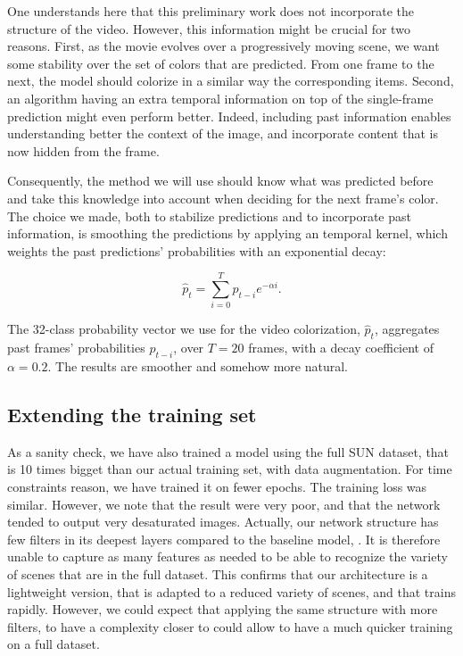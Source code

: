 \documentclass[10pt,twocolumn,letterpaper]{article}
\begin{document}
One understands here that this preliminary work does not incorporate the structure of the video. However, this information might be crucial for two reasons. First, as the movie evolves over a progressively moving scene, we want some stability over the set of colors that are predicted. From one frame to the next, the model should colorize in a similar way the corresponding items. Second, an algorithm having an extra temporal information on top of the single-frame prediction might even perform better. Indeed, including past information enables understanding better the context of the image, and incorporate content that is now hidden from the frame.

Consequently, the method we will use should know what was predicted before and take this knowledge into account when deciding for the next frame's color. The choice we made, both to stabilize predictions and to incorporate past information, is smoothing the predictions by applying an temporal kernel, which weights the past predictions' probabilities with an exponential decay:

 $$\hat p_t = \sum_{i = 0}^T p_{t-i} e^{-\alpha i}.$$

 The 32-class probability vector we use for the video colorization, $\hat p_t$, aggregates past frames' probabilities $p_{t-i}$, over $T=20$ frames, with a decay coefficient of $\alpha=0.2$. The results are smoother and somehow more natural.

\subsection{Extending the training set}

As a sanity check, we have also trained a model using the full SUN dataset, that is 10 times bigget than our actual training set, with data augmentation. For time constraints reason, we have trained it on fewer epochs. The training loss was similar. However, we note that the result were very poor, and that the network tended to output very desaturated images. Actually, our network structure has few filters in its deepest layers compared to the baseline model, \cite{zhang2016colorful}. It is therefore unable to capture as many features as needed to be able to recognize the variety of scenes that are in the full dataset. This confirms that our architecture is a lightweight version, that is adapted to a reduced variety of scenes, and that trains rapidly. However, we could expect that applying the same structure with more filters, to have a complexity closer to \cite{zhang2016colorful} could allow to have a much quicker training on a full dataset.
\end{document}

